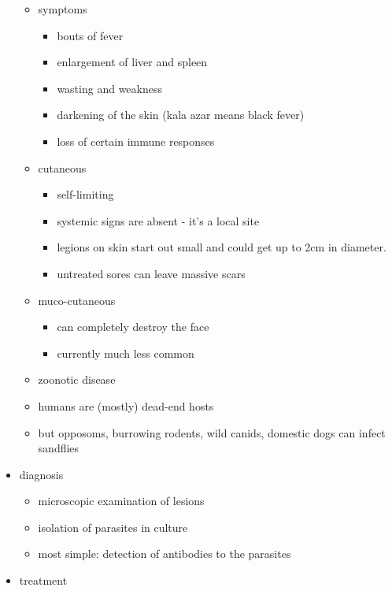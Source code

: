 \documentclass{article}
\begin{document}
\begin{itemize}
\begin{itemize}
            \item symptoms
            \begin{itemize}
                \item bouts of fever
                \item enlargement of liver and spleen
                \item wasting and weakness
                \item darkening of the skin (kala azar means black fever)
                \item loss of certain immune responses
            \end{itemize}
            \item cutaneous
            \begin{itemize}
                \item self-limiting
                \item systemic signs are absent - it's a local site
                \item legions on skin start out small and could get up to 2cm in diameter.
                \item untreated sores can leave massive scars
            \end{itemize}
            \item muco-cutaneous
            \begin{itemize}
                \item can completely destroy the face
                \item currently much less common
            \end{itemize}
            \item zoonotic disease
            \item humans are (mostly) dead-end hosts
            \item but opposoms, burrowing rodents, wild canids, domestic dogs can infect sandflies
        \end{itemize}
        \item diagnosis
        \begin{itemize}
            \item microscopic examination of lesions
            \item isolation of parasites in culture
            \item most simple: detection of antibodies to the parasites
        \end{itemize}
        \item treatment
        \begin{itemize}

\end{itemize}
\end{itemize}
\end{document}
